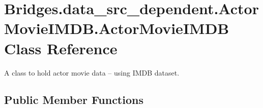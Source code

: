 \hypertarget{class_bridges_1_1data__src__dependent_1_1_actor_movie_i_m_d_b_1_1_actor_movie_i_m_d_b}{}\section{Bridges.\+data\+\_\+src\+\_\+dependent.\+Actor\+Movie\+I\+M\+D\+B.\+Actor\+Movie\+I\+M\+D\+B Class Reference}
\label{class_bridges_1_1data__src__dependent_1_1_actor_movie_i_m_d_b_1_1_actor_movie_i_m_d_b}


A class to hold actor movie data -- using I\+M\+D\+B dataset.  


\subsection*{Public Member Functions}
